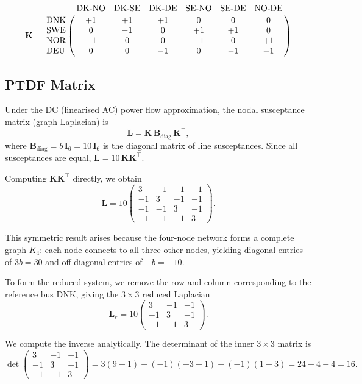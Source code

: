 \begin{equation}
\mathbf{K} =
\bordermatrix{
             & \text{DK-NO} & \text{DK-SE} & \text{DK-DE} & \text{SE-NO} & \text{SE-DE} & \text{NO-DE} \cr
\text{DNK} & +1 & +1 & +1 &  0 &  0 &  0 \cr
\text{SWE} &  0 & -1 &  0 & +1 & +1 &  0 \cr
\text{NOR} & -1 &  0 &  0 & -1 &  0 & +1 \cr
\text{DEU} &  0 &  0 & -1 &  0 & -1 & -1 \cr
}
\end{equation}

\subsection*{PTDF Matrix}

Under the DC (linearised AC) power flow approximation, the nodal susceptance matrix (graph Laplacian) is
\begin{equation}
    \mathbf{L} = \mathbf{K}\,\mathbf{B}_\text{diag}\,\mathbf{K}^\top,
\end{equation}
where $\mathbf{B}_\text{diag} = b\,\mathbf{I}_6 = 10\,\mathbf{I}_6$ is the diagonal matrix of line susceptances. Since all susceptances are equal, $\mathbf{L} = 10\,\mathbf{K}\mathbf{K}^\top$.

Computing $\mathbf{K}\mathbf{K}^\top$ directly, we obtain
\begin{equation}
\mathbf{L} = 10 \begin{pmatrix}
 3 & -1 & -1 & -1 \\
-1 &  3 & -1 & -1 \\
-1 & -1 &  3 & -1 \\
-1 & -1 & -1 &  3
\end{pmatrix}.
\end{equation}

This symmetric result arises because the four-node network forms a complete graph $K_4$: each node connects to all three other nodes, yielding diagonal entries of $3b = 30$ and off-diagonal entries of $-b = -10$.

To form the reduced system, we remove the row and column corresponding to the reference bus DNK, giving the $3\times 3$ reduced Laplacian
\begin{equation}
\mathbf{L}_r = 10 \begin{pmatrix}
 3 & -1 & -1 \\
-1 &  3 & -1 \\
-1 & -1 &  3
\end{pmatrix}.
\end{equation}

We compute the inverse analytically. The determinant of the inner $3\times 3$ matrix is
\begin{equation}
    \det\begin{pmatrix} 3 & -1 & -1 \\ -1 & 3 & -1 \\ -1 & -1 & 3 \end{pmatrix}
    = 3(9-1) - (-1)(-3-1) + (-1)(1+3) = 24 - 4 - 4 = 16.
\end{equation}

